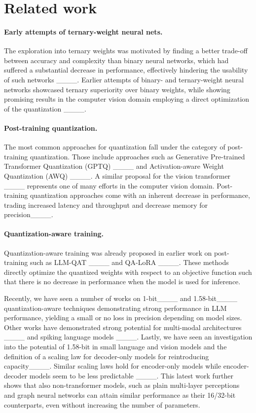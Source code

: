\section{Related work}
\paragraph{Early attempts of ternary-weight neural nets.}
The exploration into ternary weights was motivated by finding a better trade-off
between accuracy and complexity than binary neural networks, which had suffered
a substantial decrease in performance, effectively hindering the usability of such networks
____. 
Earlier attempts of binary- and ternary-weight neural networks showcased ternary superiority over binary weights, while showing promising results in the computer vision domain employing a direct optimization of the quantization ____.

\paragraph{Post-training quantization.}
The most common approaches for quantization fall under the category of post-training quantization. Those include approaches such as Generative Pre-trained Transformer Quantization (GPTQ) ____ and Activation-aware Weight Quantization (AWQ) ____. A similar proposal for the vision transformer ____ represents one of many efforts in the computer vision domain. Post-training quantization approaches come with an inherent decrease in performance, trading increased latency and throughput and decrease memory for precision____.

\paragraph{Quantization-aware training.}
Quantization-aware training was already proposed in earlier work on post-training such as LLM-QAT ____ and QA-LoRA ____. These methods directly optimize the quantized weights with respect to an objective function such that there is no decrease in performance when the model is used for inference.  

Recently, we have seen a number of works on 1-bit____ and 1.58-bit____ quantization-aware techniques demonstrating strong performance in LLM performance, yielding a small or no loss in precision depending on model sizes. Other works have demonstrated strong potential for multi-modal architectures ____ and spiking language models ____. 
Lastly, we have seen an investigation into the potential of 1.58-bit in small language and vision models and the definition of a scaling law for decoder-only models for reintroducing capacity____. Similar scaling laws hold for encoder-only models while encoder-decoder models seem to be less predictable ____. This latest work further shows that also non-transformer models, such as plain multi-layer perceptions and graph neural networks can attain similar performance as their 16/32-bit counterparts, even without increasing the number of parameters.

